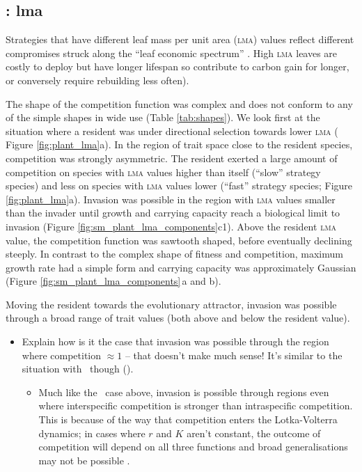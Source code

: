 \documentclass[a4paper,11pt]{article}
\begin{document}

\subsection{\plant: lma}
Strategies that have different leaf mass per unit area (\textsc{lma})
values reflect different compromises struck along the ``leaf economic spectrum''
\citep{Reich-1997,Wright-2004}.  High \textsc{lma} leaves are
costly to deploy but have longer lifespan so contribute
to carbon gain for longer, or conversely require rebuilding less
often).

The shape of the competition function was complex and does not conform
to any of the simple shapes in wide use (Table \ref{tab:shapes}).
We look first at the situation where a resident was under directional
selection towards lower \textsc{lma} ( Figure \ref{fig:plant_lma}a).
%
In the region of trait space close to the resident species,
competition was strongly asymmetric. The resident exerted a large amount
of competition on species with \textsc{lma} values higher than itself (``slow''
strategy species) and less on species with \textsc{lma} values lower
(``fast'' strategy species; Figure \ref{fig:plant_lma}a).  Invasion was
possible in the region with \textsc{lma} values smaller than the invader until
growth and carrying capacity reach a biological limit to invasion
(Figure \ref{fig:sm_plant_lma_components}c1).
%
Above the resident \textsc{lma} value, the competition function was sawtooth
shaped, before eventually declining steeply.
%
In contrast to the complex shape of fitness and competition, maximum
growth rate had a simple form and carrying capacity was approximately
Gaussian (Figure \ref{fig:sm_plant_lma_components}\,a and b).

Moving the resident towards the evolutionary attractor, invasion was
possible through a broad range of trait values (both above and below
the resident value).
\begin{itemize}
\item Explain how is it the case that invasion was possible through the
  region where competition $\approx 1$ -- that doesn't make much sense!
  It's similar to the situation with \hmat\ though (\TODO).
  \begin{itemize}
  \item Much like the \hmat\ case above, invasion is possible through
    regions even where interspecific competition is stronger than
    intraspecific competition.  This is because of the way that
    competition enters the Lotka-Volterra dynamics; in cases where $r$
    and $K$ aren't constant, the outcome of competition will depend on
    all three functions and broad generalisations may not be possible
    \citep[c.f.][]{Leimar-2013}.
  \end{itemize}
\end{itemize}
\end{document}
